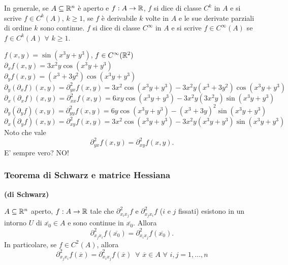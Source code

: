 \begin{definition}
	In generale, se $A \subseteq \mathbb{R}^n$ è aperto e $f:A\rightarrow\mathbb{R}$, $f$ si dice di classe $C^k$ in $A$ e si scrive $f \in C^k(A)$, $k \geq 1$, se $f$ è derivabile $k$ volte in $A$ e le sue derivate parziali di ordine $k$ sono continue. $f$ si dice di classe $C^\infty$ in $A$ e si scrive $f \in C^\infty(A)$ se $f\in C^k(A) \,\, \forall \,\, k \geq 1$.
\end{definition}


\begin{exbar}
	
	$f(x,y)=\sin(x^3y+y^3)$, $f \in C^\infty(\mathbb{R}^2)$\\
	$\partial_xf(x,y)=3x^2y \cos(x^3y+y^3)$\\
	$\partial_y f(x,y)=(x^3+3y^2)\cos(x^3y+y^3)$\\
	$\partial_y(\partial_xf)(x,y)=\partial_{yx}^2f(x,y)=3x^2 \cos(x^3y+y^3)-3x^2y(x^3+3y^2)\cos(x^3y+y^3)$\\
	$\partial_x(\partial_x f)(x,y)= \partial_{xx}^2f(x,y)=6xy\cos(x^3y+y^3)-3x^2y(3x^2y)\sin(x^3y+y^3)$\\
	$\partial_y(\partial_y f)(x,y)=\partial_{yy}^2f(x,y)=6y\cos(x^3y+y^3)-(x^3+3y)^2\sin(x^3y+y^3)$\\
	$\partial_x(\partial_y f)(x,y)=\partial_{xy}^2f(x,y)=3x^2\cos(x^3y+y^3)-3x^2y(x^3y+y^3)\sin(x^3y+y^3)$\\
	Noto che vale
	\begin{equation*}
		\partial_{yx}^2f(x,y)=\partial_{xy}^2f(x,y).
	\end{equation*}
	E' sempre vero? NO!
\end{exbar}


\subsubsection{Teorema di Schwarz e matrice Hessiana}
\begin{theorem} \textbf{(di Schwarz)}
	
	$A \subseteq\mathbb{R}^n$ aperto, $f:A\rightarrow\mathbb{R}$ tale che $\partial_{x_ix_j}^2f$ e $\partial_{x_jx_i}^2f$ ($i$ e $j$ fissati) esistono in un intorno $U$ di $\overline{x_0}\in A$ e sono continue in $\overline{x_0}$. Allora
	\begin{equation*}
		\partial_{x_jx_i}^2f(\overline{x_0})=\partial_{x_ix_j}^2f(\overline{x_0}).
	\end{equation*}
	In particolare, se $f \in C^2(A)$, allora 
	\begin{equation*}
		\partial_{x_jx_i}^2f(\overline{x})=\partial_{x_ix_j}^2f(\overline{x})\,\,\, \forall\,\, \overline{x} \in A\,\, \forall \,\,i,j=1,...,n 
	\end{equation*}  
\end{theorem}


